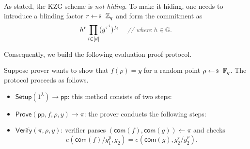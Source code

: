 \documentclass[../../book]{subfiles}
\begin{document}
\begin{remark}
    As stated, the KZG scheme is \emph{not hiding}. To make it hiding, one needs to introduce a blinding factor $r \leftarrowS \mathbb{Z}_q$ and form the commitment as
    \begin{equation*}
        h^r\prod_{i \in [d]}(g^{\tau^i})^{f_i} \quad \commentgray{where $h \in \mathbb{G}$.}
    \end{equation*}
\end{remark}

Consequently, we build the following evaluation proof protocol.

\begin{definition}\label{def:kzg-proof}
    Suppose prover wants to show that $f(\rho)=y$ for a random point $\rho \leftarrowS \mathbb{F}_q$.
    The protocol proceeds as follows.
    \begin{itemize}
        \item $\mathsf{Setup}(1^{\lambda}) \to \mathsf{pp}$: this method consists of two steps:
        \item $\mathsf{Prove}(\mathsf{pp},f,\rho,y) \to \pi$: the prover conducts the following steps: 
        \item $\mathsf{Verify}(\pi, \rho, y)$: verifier parses $(\mathsf{com}(f), \mathsf{com}(g)) \gets \pi$ and checks
        \begin{equation*}
            e(\mathsf{com}(f)/g_1^y, g_2) = e(\mathsf{com}(g), g_2^{\tau}/g_2^{\rho}).
        \end{equation*}
    \end{itemize}
\end{definition}
\end{document}

